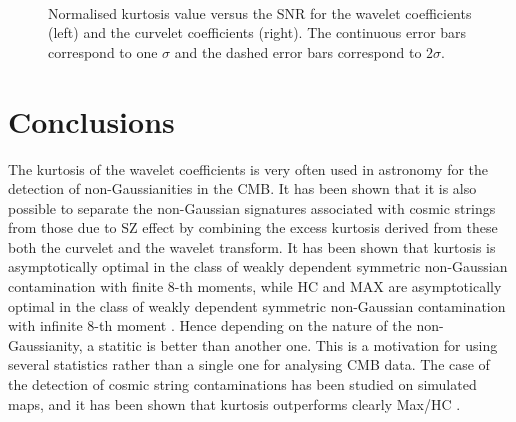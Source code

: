 \begin{figure}[htb]
\centerline{
 \hbox{
}
}
\caption{Normalised kurtosis value versus the SNR for the wavelet coefficients (left) and the curvelet coefficients (right). 
The continuous error bars correspond to one $\sigma$ and the dashed error bars correspond to $2\sigma$.}
\label{fig_wtcur_sphere_linegauss}
\end{figure}

\section{Conclusions}

The kurtosis of the wavelet coefficients is very often used in astronomy for the detection of non-Gaussianities in the CMB. It has been 
shown \cite{starck:sta03_1} that it is also possible to separate the non-Gaussian signatures associated with cosmic strings from those 
due to SZ effect by combining the excess kurtosis derived from these both the curvelet and the wavelet transform. It has been shown that 
kurtosis is asymptotically optimal in the class of weakly dependent symmetric non-Gaussian contamination with finite 8-th moments, while 
HC and MAX are asymptotically optimal in the class of weakly dependent symmetric non-Gaussian contamination with infinite 8-th moment \cite{starck:jin05}. 
Hence depending on the nature of the non-Gaussianity, a statitic is better than another one. This is a motivation for using several statistics 
rather than a single one for analysing CMB data. The case of the detection of cosmic string contaminations has been studied on simulated maps, 
and it has been shown that kurtosis outperforms clearly Max/HC \cite{starck:jin05}.  




